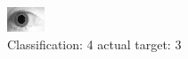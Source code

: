 \begin{figure}[h!]
\begin{center}
\includegraphics[width=0.60\columnwidth]{figures/ID1850_class_4_target_3.png}
\end{center}
\caption{ Classification: 4 actual target: 3}
\label{fig:ID1850_class_4_target_3}
\end{figure}
